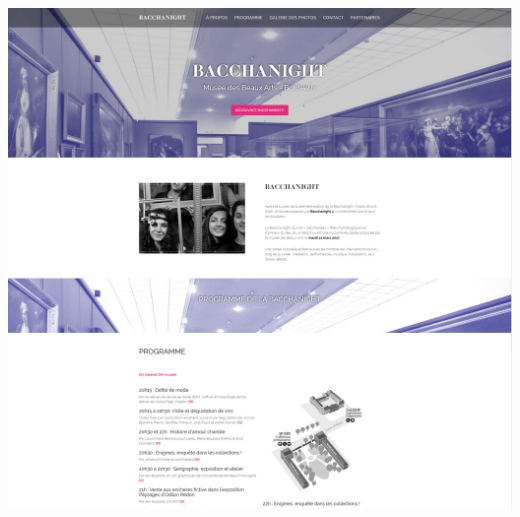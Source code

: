 \documentclass[11pt]{report}
\begin{document}
\vspace{0.4cm}
\includegraphics[width=\textwidth,height=\textheight,keepaspectratio]{preview2.png}
\end{document}

